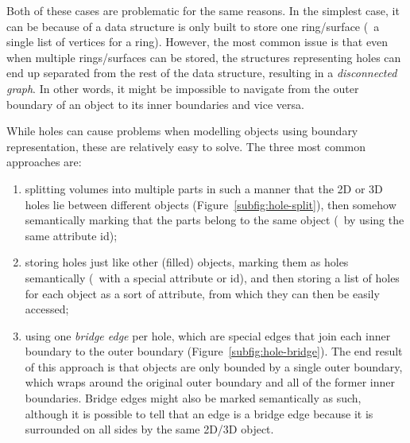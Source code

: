 Both of these cases are problematic for the same reasons.
In the simplest case, it can be because of a data structure is only built to store one ring/surface (\eg\ a single list of vertices for a ring).
However, the most common issue is that even when multiple rings/surfaces can be stored, the structures representing holes can end up separated from the rest of the data structure, resulting in a \emph{disconnected graph}.
In other words, it might be impossible to navigate from the outer boundary of an object to its inner boundaries and vice versa.

While holes can cause problems when modelling objects using boundary representation, these are relatively easy to solve.
The three most common approaches are: 
\begin{enumerate}
	\item splitting volumes into multiple parts in such a manner that the 2D or 3D holes lie between different objects (Figure~\ref{subfig:hole-split}), then somehow semantically marking that the parts belong to the same object (\eg\ by using the same attribute id); 
	\item storing holes just like other (filled) objects, marking them as holes semantically (\eg\ with a special attribute or id), and then storing a list of holes for each object as a sort of attribute, from which they can then be easily accessed;
	\item using one \emph{bridge edge} per hole, which are special edges that join each inner boundary to the outer boundary (Figure~\ref{subfig:hole-bridge}).
	The end result of this approach is that objects are only bounded by a single outer boundary, which wraps around the original outer boundary and all of the former inner boundaries.
	Bridge edges might also be marked semantically as such, although it is possible to tell that an edge is a bridge edge because it is surrounded on all sides by the same 2D/3D object.
\end{enumerate}


